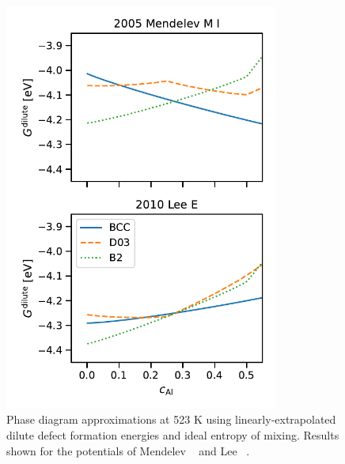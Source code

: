 \begin{figure}[h]
    \centering
    \includegraphics[width=0.8\textwidth]{figures/zerok_phases_dilute_point_defects}
    \caption{Phase diagram approximations at 523 K using linearly-extrapolated dilute defect formation energies and ideal entropy of mixing. Results shown for the potentials of Mendelev \etal~\cite{mendelev2005effect} and Lee \etal~\cite{lee2010modified}.}
    \label{fig:0K_dilute_phases}
\end{figure}
%

